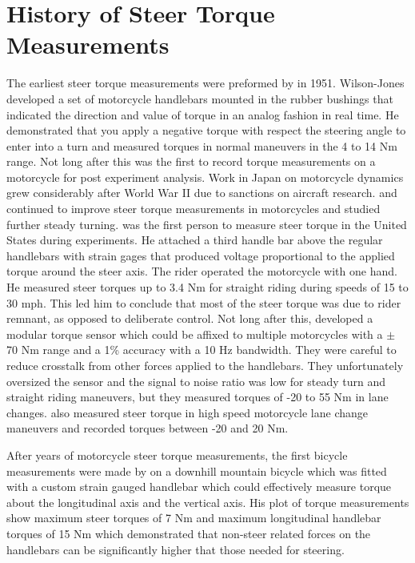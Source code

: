 \documentclass[a4paper]{article}
\begin{document}
\section*{History of Steer Torque Measurements}

The earliest steer torque measurements were preformed by
\cite{Wilson-Jones1951} in 1951. Wilson-Jones developed a set of motorcycle
handlebars mounted in the rubber bushings that indicated the direction and
value of torque in an analog fashion in real time. He demonstrated that you
apply a negative torque with respect the steering angle to enter into a turn
and measured torques in normal maneuvers in the 4 to 14 Nm range. Not long
after this \cite{Kondo1955} was the first to record torque measurements on a
motorcycle for post experiment analysis. Work in Japan on motorcycle dynamics
grew considerably after World War II due to sanctions on aircraft research.
\cite{Kageyama1959} and \cite{Fu1965} continued to improve steer torque
measurements in motorcycles and studied further steady turning.
\cite{Eaton1973} was the first person to measure steer torque in the United
States during experiments. He attached a third handle bar above the regular
handlebars with strain gages that produced voltage proportional to the applied
torque around the steer axis. The rider operated the motorcycle with one hand.
He measured steer torques up to 3.4 Nm for straight riding during speeds of 15
to 30 mph. This led him to conclude that most of the steer torque was due to
rider remnant, as opposed to deliberate control. Not long after this,
\cite{Weir1979a} developed a modular torque sensor which could be affixed to
multiple motorcycles with a $\pm$ 70 Nm range and a 1\% accuracy with a 10 Hz
bandwidth. They were careful to reduce crosstalk from other forces applied to
the handlebars. They unfortunately oversized the sensor and the signal to noise
ratio was low for steady turn and straight riding maneuvers, but they measured
torques of -20 to 55 Nm in lane changes. \cite{Sugizaki1988} also measured steer
torque in high speed motorcycle lane change maneuvers and recorded torques
between -20 and 20 Nm.

After years of motorcycle steer torque measurements, the first bicycle
measurements were made by \cite{Lorenzo1997} on a downhill mountain bicycle
which was fitted with a custom strain gauged handlebar which could effectively
measure torque about the longitudinal axis and the vertical axis. His plot of
torque measurements show maximum steer torques of 7 Nm and maximum longitudinal
handlebar torques of 15 Nm which demonstrated that non-steer related forces on
the handlebars can be significantly higher that those needed for steering.
\end{document}
